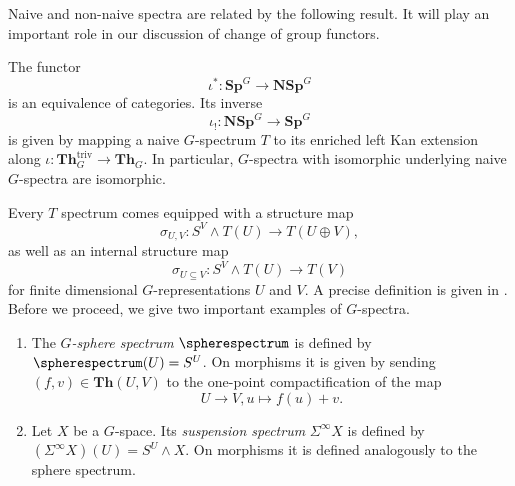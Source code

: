 Naive and non-naive spectra are related by the following result. It will play an important
role in our discussion of change of group functors.
\begin{thm}\label{thm:naiveisnotnaive}
The functor
\[
\iota^\ast: \mathbf{Sp}^G\to \mathbf{NSp}^G
\]
is an equivalence of categories. 
Its inverse
\[
\iota_!: \mathbf{NSp}^G\to \mathbf{Sp}^G
\]
is given by mapping a naive $G$-spectrum $T$
to its enriched left Kan extension along $\iota:\mathbf{Th}^{\mathrm{triv}}_G\to 
\mathbf{Th}_G$.
In particular, $G$-spectra
with isomorphic underlying naive $G$-spectra are isomorphic.
\end{thm}

Every $T$ spectrum comes equipped with a structure map
\begin{equation}\label{eq:structuremap}
\sigma_{U,V}: S^V\wedge T(U)\to T(U\oplus V),
\end{equation}
as well as an internal structure map
\begin{equation}\label{eq:internalstructuremap}
\sigma_{U\subseteq V}: S^V\wedge T(U)\to T(V)
\end{equation}
for finite dimensional $G$-representations $U$ and $V$.
A precise definition is given in \cite[Definition~4.6, \pno~1505]{rvadams}.
Before we proceed, we give two important examples of $G$-spectra.
\begin{bsp}
\begin{enumerate}
\item The $G$\textit{-sphere spectrum} $\spherespectrum$
is defined by $\spherespectrum(U) = S^U$. On morphisms
it is given by sending $(f,v)\in \mathbf{Th}(U,V)$
to the one-point compactification of the map
\[
U\to V, u\mapsto f(u)+v.
\]
\item Let $X$ be a $G$-space. Its \textit{suspension spectrum}
$\Sigma^\infty X$ is defined by $(\Sigma^\infty X)(U) = S^U\wedge X$.
On morphisms it is defined analogously to the sphere spectrum.
\end{enumerate}
\end{bsp}

